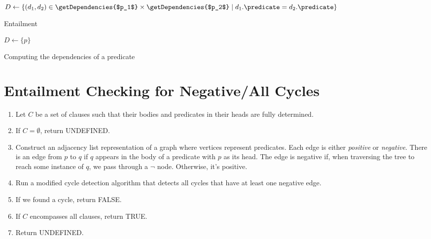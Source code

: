 \documentclass[runningheads]{llncs}
\begin{document}
\begin{algorithm}
  $D \gets \{ (d_1, d_2) \in \getDependencies{$p_1$} \times
  \getDependencies{$p_2$} \mid d_1.\predicate = d_2.\predicate \}$\;
  \;
  \caption{Entailment}
\end{algorithm}

\begin{algorithm}
   {
    $D \gets \{ p \}$\;
    \;
  }
  \caption{Computing the dependencies of a predicate}
\end{algorithm}

\section{Entailment Checking for Negative/All Cycles}

\begin{enumerate}
\item Let $C$ be a set of clauses such that their bodies and predicates in their
  heads are fully determined.
\item If $C = \emptyset$, return UNDEFINED.
\item Construct an adjacency list representation of a graph where vertices
  represent predicates. Each edge is either \emph{positive} or \emph{negative}.
  There is an edge from $p$ to $q$ if $q$ appears in the body of a predicate
  with $p$ as its head. The edge is negative if, when traversing the tree to
  reach some instance of $q$, we pass through a $\neg$ node. Otherwise, it's
  positive.
\item Run a modified cycle detection algorithm that detects all cycles that have
  at least one negative edge.
\item If we found a cycle, return FALSE.
\item If $C$ encompasses all clauses, return TRUE.
\item Return UNDEFINED.
\end{enumerate}
\end{document}
